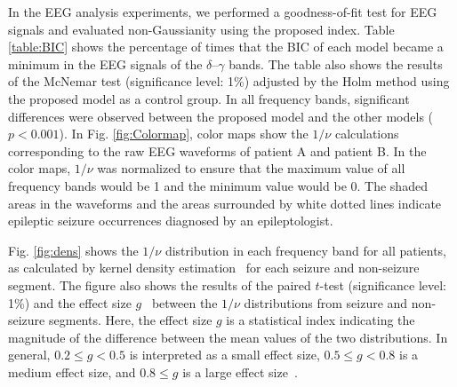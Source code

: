 \documentclass[journal]{IEEEtran}
\begin{document}
In the EEG analysis experiments, we performed a goodness-of-fit test for EEG signals and evaluated non-Gaussianity using the proposed index.
Table \ref{table:BIC} shows the percentage of times that the BIC of each model became a minimum in the EEG signals of the $\delta$--$\gamma$ bands.
The table also shows the results of the McNemar test (significance level: 1\%) adjusted by the Holm method using the proposed model as a control group.
In all frequency bands, significant differences were observed between the proposed model and the other models ($p < 0.001$).
In Fig. \ref{fig:Colormap}, color maps show the $1/\nu$ calculations corresponding to the raw EEG waveforms of patient A and patient B.
In the color maps, $1/\nu$ was normalized to ensure that the maximum value of all frequency bands would be 1 and the minimum value would be 0.
The shaded areas in the waveforms and the areas surrounded by white dotted lines indicate epileptic seizure occurrences diagnosed by an epileptologist.

Fig. \ref{fig:dens} shows the $1/\nu$ distribution in each frequency band for all patients, as calculated by kernel density estimation~\cite{Parzen1962} for each seizure and non-seizure segment.
The figure also shows the results of the paired $t$-test (significance level: 1\%) and the effect size $g$~\cite{Hedges1981} between the $1/\nu$ distributions from seizure and non-seizure segments.
Here, the effect size $g$ is a statistical index indicating the magnitude of the difference between the mean values of the two distributions.
In general, $0.2 \leq g < 0.5$ is interpreted as a small effect size, $0.5 \leq g < 0.8$ is a medium effect size, and $0.8 \leq g$ is a large effect size~\cite{Cohen2013}.
\end{document}

